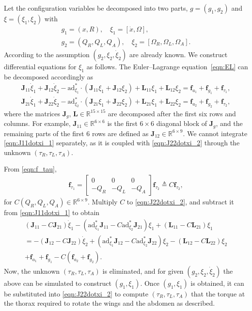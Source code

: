 \documentclass[10pt]{article}
\renewcommand{\Re}{\ensuremath{\mathbb{R}}}
\newcommand{\ad}{\ensuremath{\mathrm{ad}}}
\begin{document}
Let the configuration variables be decomposed into two parts, $g=(g_1,g_2)$ and $\xi=(\xi_1,\xi_2)$ with
\begin{gather}
    g_1 = (x, R), \quad \xi_1 = [\dot x, \Omega], \label{eqn:g1xi1}\\
    g_2 = (Q_R, Q_L, Q_A), \quad \xi_2 = [\Omega_R, \Omega_L, \Omega_A].\label{eqn:g2xi2}
\end{gather}
According to the assumption $(g_2,\xi_2,\dot\xi_2)$ are already known. 
We construct differential equations for $\xi_1$ as follows. 
The Euler--Lagrange equation~\eqref{eqn:EL} can be decomposed accordingly as
\begin{align}
    \mathbf{J}_{11}\dot \xi_1 + \mathbf{J}_{12}\dot\xi_2 -\ad^*_{\xi_1}\cdot(\mathbf{J}_{11}\xi_1 + \mathbf{J}_{12}\xi_2) + \mathbf{L}_{11}\xi_1 + \mathbf{L}_{12}\xi_2 = \mathbf{f}_{a_1} + \mathbf{f}_{g_1} + \mathbf{f}_{\tau_1},\label{eqn:J11dotxi_1}\\
    \mathbf{J}_{21}\dot \xi_1 + \mathbf{J}_{22}\dot\xi_2 -\ad^*_{\xi_2}\cdot(\mathbf{J}_{21}\xi_1 + \mathbf{J}_{22}\xi_2) + \mathbf{L}_{21}\xi_1 + \mathbf{L}_{22}\xi_2 = \mathbf{f}_{a_2} + \mathbf{f}_{g_2} + \mathbf{f}_{\tau_2},\label{eqn:J22dotxi_2}
\end{align}
where the matrices $\mathbf{J}_g$, $\mathbf{L}\in\Re^{15\times 15}$ are decomposed after the first six rows and columns. 
For example, $\mathbf{J}_11\in\Re^{6\times 6}$ is the first $6\times 6$ diagonal block of $\mathbf{J}_g$, and the remaining parts of the first 6 rows are defined as $\mathbf{J}_{12}\in\Re^{6\times 9}$. 
We cannot integrate \eqref{eqn:J11dotxi_1} separately, as it is coupled with \eqref{eqn:J22dotxi_2} through the unknown $(\tau_R,\tau_L,\tau_A)$.

From \eqref{eqn:f_tau},
\begin{align*}
    \mathbf{f}_{\tau_1} = \begin{bmatrix} 0 & 0 & 0 \\
    -Q_R & -Q_L & -Q_A \end{bmatrix} \mathbf{f}_{\tau_2} 
    \triangleq C \mathbf{f}_{\tau_2},
\end{align*}
for $C(Q_R,Q_L,Q_A)\in\Re^{6\times 9}$. 
Multiply $C$ to \eqref{eqn:J22dotxi_2}, and subtract it from \eqref{eqn:J11dotxi_1} to obtain
\begin{gather}
    (\mathbf{J}_{11}-C\mathbf{J}_{21})\dot \xi_1 -(\ad^*_{\xi_1}\mathbf{J}_{11}-C\ad^*_{\xi_2} \mathbf{J}_{21} )\xi_1 + (\mathbf{L}_{11}-C\mathbf{L}_{21})\xi_1 \nonumber \\ 
=   - (\mathbf{J}_{12}-C\mathbf{J}_{22})\dot \xi_2 +(\ad^*_{\xi_1}\mathbf{J}_{12}-C\ad^*_{\xi_2} \mathbf{J}_{22} )\xi_2 - (\mathbf{L}_{12}-C\mathbf{L}_{22})\xi_2 \nonumber \\ 
+ \mathbf{f}_{a_1}+\mathbf{f}_{g_1}-C(\mathbf{f}_{a_2}+\mathbf{f}_{g_2}).\label{eqn:EL_xR}
\end{gather}
Now, the unknown $(\tau_R,\tau_L,\tau_A)$ is eliminated, and for given $(g_2,\xi_2,\dot\xi_2)$ the above can be simulated to construct $(g_1,\xi_1)$. 
Once $(g_1,\xi_1)$ is obtained, it can be substituted into \eqref{eqn:J22dotxi_2} to compute $(\tau_R,\tau_L,\tau_A)$ that the torque at the thorax required to rotate the wings and the abdomen as described. 
\end{document}
